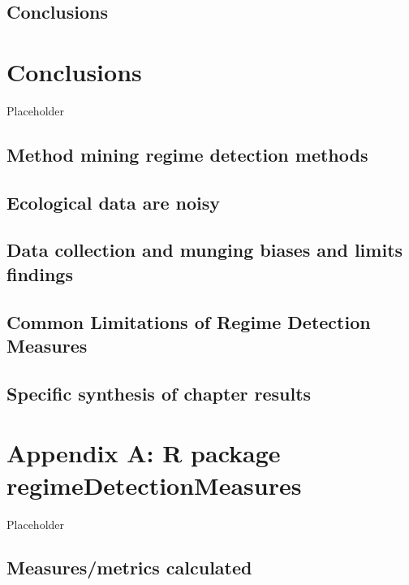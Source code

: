 \documentclass[12pt,twoside,openany]{reedthesis}
\begin{document}
\section{Conclusions}\label{conclusions-1}

\chapter{Conclusions}\label{conclusions}

Placeholder

\section{Method mining regime detection
methods}\label{method-mining-regime-detection-methods}

\section{Ecological data are noisy}\label{ecological-data-are-noisy}

\section{Data collection and munging biases and limits
findings}\label{data-collection-and-munging-biases-and-limits-findings}

\section{Common Limitations of Regime Detection
Measures}\label{common-limitations-of-regime-detection-measures}

\section{Specific synthesis of chapter
results}\label{specific-synthesis-of-chapter-results}

\chapter*{Appendix A: R package
regimeDetectionMeasures}\label{regimeDetectionMeasures}

Placeholder

\section{Measures/metrics calculated}\label{measuresmetrics-calculated}
\end{document}
